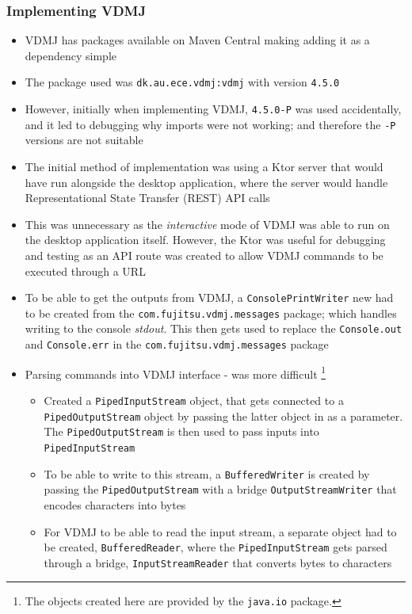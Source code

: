 \documentclass[../dissertation.tex]{subfiles}
\begin{document}
\subsubsection{Implementing VDMJ}
\begin{itemize}
  \item VDMJ has packages available on Maven Central making adding it as a dependency simple
  \item The package used was \lstinline|dk.au.ece.vdmj:vdmj| with version \lstinline|4.5.0|
  \item However, initially when implementing VDMJ, \lstinline|4.5.0-P| was used accidentally,
    and it led to debugging why imports were not working; and therefore the \lstinline|-P|
    versions are not suitable
  \item The initial method of implementation was using a Ktor server that would have run
    alongside the desktop application, where the server would handle Representational State Transfer (REST)
    API calls
  \item This was unnecessary as the \textit{interactive} mode of VDMJ was able to run on
    the desktop application itself. However, the Ktor was useful for debugging and testing as
    an API route was created to allow VDMJ commands to be executed through a URL

  \item To be able to get the outputs from VDMJ, a \lstinline|ConsolePrintWriter| new had to be
    created from the \lstinline|com.fujitsu.vdmj.messages| package; which handles writing to
    the console \textit{stdout}. This then gets used to replace the \lstinline|Console.out| and
    \lstinline|Console.err| in the \lstinline|com.fujitsu.vdmj.messages| package

  \item Parsing commands into VDMJ interface - was more difficult
    \footnote{The objects created here are provided by the \lstinline|java.io| package.}
  \begin{itemize}
    \item Created a \lstinline|PipedInputStream| object, that gets connected to a \lstinline|PipedOutputStream|
      object by passing the latter object in as a parameter. The \lstinline|PipedOutputStream| is then used
      to pass inputs into \lstinline|PipedInputStream|
    \item To be able to write to this stream, a \lstinline|BufferedWriter| is created by passing the \lstinline|PipedOutputStream|
      with a bridge \lstinline|OutputStreamWriter| that encodes characters into bytes
    \item For VDMJ to be able to read the input stream, a separate object had to be created, \lstinline|BufferedReader|,
      where the \lstinline|PipedInputStream| gets parsed through a bridge, \lstinline|InputStreamReader| that converts
      bytes to characters
  \end{itemize}
\end{itemize}
\end{document}
